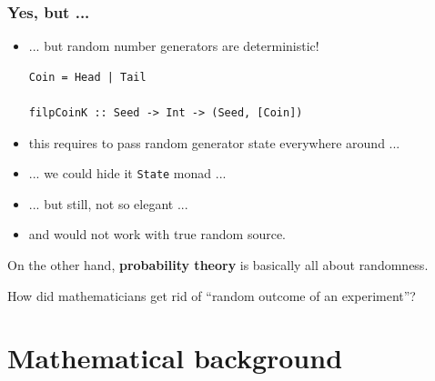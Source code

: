 \documentclass[mathserif, 8pt, handout]{beamer}
\begin{document}
\begin{frame}[fragile]
  \frametitle{Yes, but ...}
  \begin{itemize}
  \item ... but random number generators are deterministic!

\begin{verbatim}
Coin = Head | Tail

filpCoinK :: Seed -> Int -> (Seed, [Coin])
\end{verbatim}

    \pause
  \item this requires to pass random generator state everywhere around ...
    \pause
  \item ... we could hide it \verb|State| monad ...
  \item ... but still, not so elegant ...
  \item and would not work with true random source.
  \end{itemize}

    \pause

  On the other hand, \textbf{probability theory} is basically
  all about randomness.

  \alert{How did mathematicians get rid of ``random outcome of an experiment''?}
\end{frame}

\section{Mathematical background}
\end{document}
